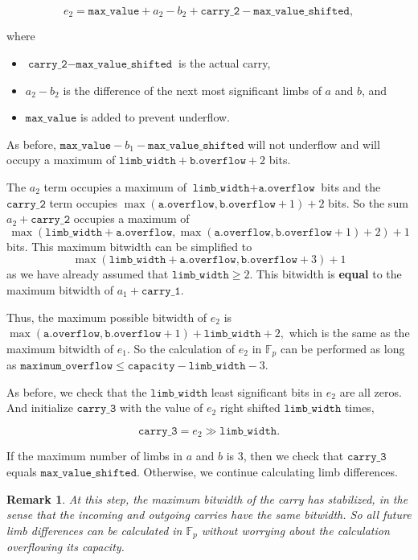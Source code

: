 \documentclass[a4paper, 12pt]{article}
\newtheorem*{remark}{Remark}
\begin{document}
\begin{itemize}
    $$e_2 = \texttt{max\_value} + a_2 - b_2 + \texttt{carry\_2} - \texttt{max\_value\_shifted},$$

    where

    \begin{itemize}
      \item  $\texttt{carry\_2} - \texttt{max\_value\_shifted}$ is the actual carry,
      \item  $a_2 - b_2$ is the difference of the next most significant limbs of $a$ and $b$, and
      \item $\texttt{max\_value}$ is added to prevent underflow.
    \end{itemize}

    As before, $\texttt{max\_value} - b_1 - \texttt{max\_value\_shifted}$ will not underflow and will occupy a maximum of $\texttt{limb\_width} + \texttt{b.overflow} + 2$ bits.

    The $a_2$ term occupies a maximum of $\texttt{limb\_width} + \texttt{a.overflow}$ bits and the $\texttt{carry\_2}$ term occupies $\max(\texttt{a.overflow}, \texttt{b.overflow} + 1) + 2$ bits. So the sum $a_2 + \texttt{carry\_2}$ occupies a maximum of 
    $$\max(\texttt{limb\_width} + \texttt{a.overflow}, \max(\texttt{a.overflow}, \texttt{b.overflow} + 1) + 2) + 1$$
    bits. This maximum bitwidth can be simplified to 
    $$\max(\texttt{limb\_width} + \texttt{a.overflow}, \texttt{b.overflow} + 3) + 1$$
    as we have already assumed that $\texttt{limb\_width} \ge 2$. This bitwidth is \textbf{equal} to the maximum bitwidth of $a_1 + \texttt{carry\_1}$.

    Thus, the maximum possible bitwidth of $e_2$ is $\max(\texttt{a.overflow}, \texttt{b.overflow} + 1) + \texttt{limb\_width} + 2,$ which is the same as the maximum bitwidth of $e_1$. So the calculation of $e_2$ in $\mathbb{F}_p$ can be performed as long as $\texttt{maximum\_overflow} \le \texttt{capacity} - \texttt{limb\_width} - 3$.

    As before, we check that the $\texttt{limb\_width}$ least significant bits in $e_2$ are all zeros. And initialize $\texttt{carry\_3}$ with the value of $e_2$ right shifted $\texttt{limb\_width}$ times,

    $$\texttt{carry\_3} = e_2 \gg \texttt{limb\_width}.$$

    If the maximum number of limbs in $a$ and $b$ is 3, then we check that $\texttt{carry\_3}$ equals $\texttt{max\_value\_shifted}$. Otherwise, we continue calculating limb differences.

    \begin{remark}
    At this step, the maximum bitwidth of the carry has stabilized, in the sense that the incoming and outgoing carries have the same bitwidth. So all future limb differences can be calculated in $\mathbb{F}_p$ without worrying about the calculation overflowing its capacity.
    \end{remark}

\end{itemize}
\end{document}
